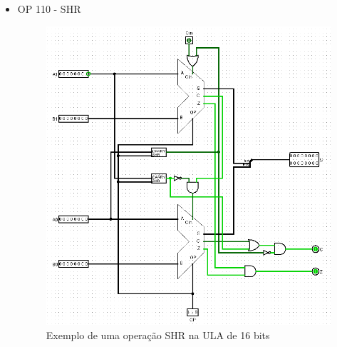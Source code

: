 \documentclass[
	12pt,				%
	openright,			%
	twoside,			%
	a4paper,			%
	english,			%
	french,				%
	spanish,			%
	brazil,				%
	]{abntex2}
\begin{document}
\begin{apendicesenv}
\begin{itemize}
\newpage
\item{OP 110 - SHR}
\begin{figure}[h]
	\begin{center}
	    \includegraphics[scale=0.55]{imagens/ULA16SHR.png}
	\end{center}
\caption{\label{ula16shr}Exemplo de uma operação SHR na ULA de 16 bits}
\end{figure}


\end{itemize}
\end{apendicesenv}
\end{document}
